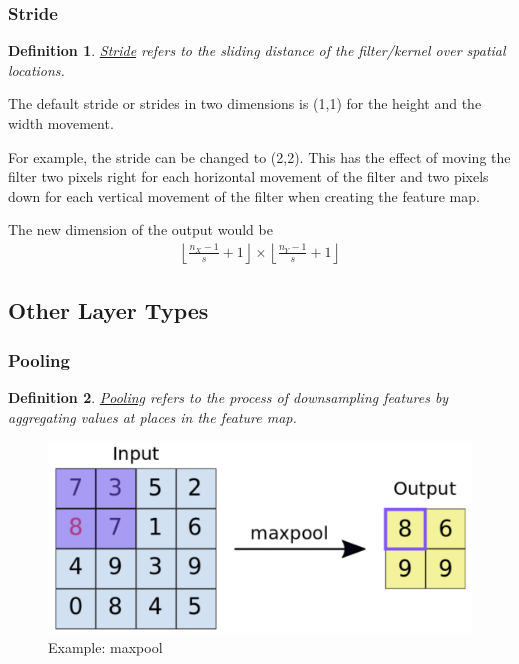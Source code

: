 \documentclass[11pt,a4paper]{article}
\newtheorem{definition}{Definition}
\begin{document}
\subsubsection{Stride}
\begin{definition}
    \underline{Stride} refers to the sliding distance of the filter/kernel over spatial locations.
\end{definition}
The default stride or strides in two dimensions is (1,1) for the height and the width movement.

For example, the stride can be changed to (2,2). This has the effect of moving the filter two pixels right for each horizontal movement of the filter and two pixels down for each vertical movement of the filter when creating the feature map.

The new dimension of the output would be
\begin{equation}
    \begin{aligned}
        \left\lfloor \frac{n_X-1}{s}+1\right\rfloor\times\left\lfloor \frac{n_Y-1}{s}+1\right\rfloor
    \end{aligned}
    \nonumber
\end{equation}

\subsection{Other Layer Types}
\subsubsection{Pooling}
\begin{definition}
    \underline{Pooling} refers to the process of downsampling features by aggregating values at places in the feature map.
\end{definition}
\begin{center}\begin{figure}[htbp]
    \centering
    \includegraphics[scale=0.1]{maxpool.png}
    \caption{Example: maxpool}
    \label{}
\end{figure}\end{center}
\end{document}
